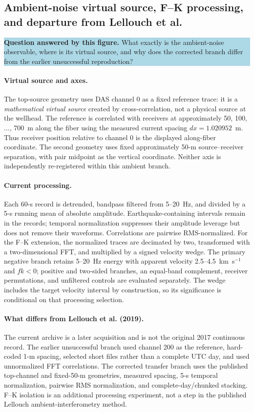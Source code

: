\documentclass[11pt]{article}
\newcommand{\figquestion}[1]{\par\medskip\noindent\colorbox{lightblue}{\parbox{0.95\linewidth}{\textcolor{questionblue}{\textbf{Question answered by this figure.}} #1}}\par\medskip}
\begin{document}
\subsection{Ambient-noise virtual source, F--K processing, and departure from Lellouch et al.}
\figquestion{What exactly is the ambient-noise observable, where is its virtual source, and why does the corrected branch differ from the earlier unsuccessful reproduction?}

\paragraph{Virtual source and axes.} The top-source geometry uses DAS channel 0 as a fixed reference trace: it is a \emph{mathematical virtual source} created by cross-correlation, not a physical source at the wellhead. The reference is correlated with receivers at approximately 50, 100, ..., 700~m along the fiber using the measured current spacing $d x=1.020952$~m. Thus receiver position relative to channel 0 is the displayed along-fiber coordinate. The second geometry uses fixed approximately 50-m source--receiver separation, with pair midpoint as the vertical coordinate. Neither axis is independently re-registered within this ambient branch.

\paragraph{Current processing.} Each 60-s record is detrended, bandpass filtered from 5--20~Hz, and divided by a 5-s running mean of absolute amplitude. Earthquake-containing intervals remain in the records; temporal normalization suppresses their amplitude leverage but does not remove their waveforms. Correlations are pairwise RMS-normalized. For the F--K extension, the normalized traces are decimated by two, transformed with a two-dimensional FFT, and multiplied by a signed velocity wedge. The primary negative branch retains 5--20~Hz energy with apparent velocity 2.5--4.5~km~s$^{-1}$ and $f k<0$; positive and two-sided branches, an equal-band complement, receiver permutations, and unfiltered controls are evaluated separately. The wedge includes the target velocity interval by construction, so its significance is conditional on that processing selection.

\paragraph{What differs from Lellouch et al. (2019).} The current archive is a later acquisition and is not the original 2017 continuous record. The earlier unsuccessful branch used channel 200 as the reference, hard-coded 1-m spacing, selected short files rather than a complete UTC day, and used unnormalized FFT correlations. The corrected transfer branch uses the published top-channel and fixed-50-m geometries, measured spacing, 5-s temporal normalization, pairwise RMS normalization, and complete-day/chunked stacking. F--K isolation is an additional processing experiment, not a step in the published Lellouch ambient-interferometry method.
\end{document}
